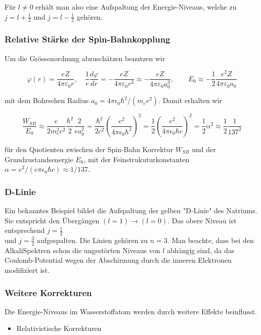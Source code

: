 \documentclass[10pt, letterpaper]{article}
\begin{document}
Für $l \neq 0$ erhält man also eine Aufspaltung der Energie-Niveaus, welche zu $j=l+\frac{1}{2}$ und $j=l-\frac{1}{2}$ gehören.

\subsubsection*{Relative Stärke der Spin-Bahnkopplung}
Um die Grössenordnung abzuschätzen benutzen wir

$$
\varphi(r)=\frac{e Z}{4 \pi \varepsilon_{0} r}, \quad \frac{1}{r} \frac{d \varphi}{d r}=-\frac{e Z}{4 \pi \varepsilon_{0} r^{3}} \approx-\frac{e Z}{4 \pi \varepsilon_{0} a_{0}^{3}}, \quad \quad E_{0} \approx-\frac{1}{2} \frac{e^{2} Z}{4 \pi \varepsilon_{0} a_{0}}
$$

mit dem Bohrschen Radius $a_{0}=4 \pi \epsilon_{0} \hbar^{2} /\left(m_{e} e^{2}\right)$. Damit erhalten wir

$$
\frac{W_{S B}}{E_{0}} \approx \frac{e}{2 m_{e}^{2} c^{2}} \frac{\hbar^{2}}{2} \frac{2}{e a_{0}^{2}}=\frac{\hbar^{2}}{2 c^{2}}\left(\frac{e^{2}}{4 \pi \epsilon_{0} \hbar^{2}}\right)^{2}=\frac{1}{2}\left(\frac{e^{2}}{4 \pi \epsilon_{0} \hbar c}\right)^{2}=\frac{1}{2} \alpha^{2} \approx \frac{1}{2} \frac{1}{137^{2}}
$$

für den Quotienten zwischen der Spin-Bahn Korrektur $W_{S B}$ und der Grundzustandsenergie $E_{0}$, mit der Feinstrukuturkonstanten $\alpha=e^{2} /\left(e \pi \epsilon_{0} \hbar c\right) \approx 1 / 137$.

\subsubsection*{D-Linie}
Ein bekanntes Beispiel bildet die Aufspaltung der gelben "D-Linie" des Natriums. Sie entspricht den Übergängen $(l=1) \rightarrow(l=0)$. Das obere Niveau ist entsprechend $j=\frac{1}{2}$\\
und $j=\frac{3}{2}$ aufgespalten. Die Linien gehören zu $n=3$. Man beachte, dass bei den AlkaliSpektren schon die ungestörten Niveaus von $l$ abhängig sind, da das Coulomb-Potential wegen der Abschirmung durch die inneren Elektronen modifiziert ist.

\subsubsection*{Weitere Korrekturen}
Die Energie-Niveaus im Wasserstoffatom werden durch weitere Effekte beinflusst.

\begin{itemize}
  \item Relativistische Korrekturen
\end{itemize}
\end{document}
